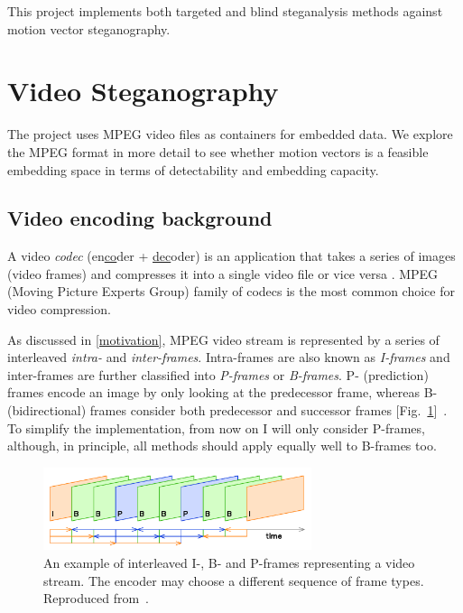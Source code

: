 \documentclass[12pt,british,twoside,notitlepage,usenames,dvipsnames,hypens,final]{report}
\numberwithin{equation}{section}
\numberwithin{figure}{section}
\begin{document}
This project implements both targeted and blind steganalysis methods against motion vector steganography.

\section{Video Steganography}

The project uses MPEG video files as containers for embedded data. We explore the MPEG format in more detail to see whether motion vectors is a feasible embedding space in terms of detectability and embedding capacity.  

\subsection{Video encoding background}

A video \emph{codec} (en\underline{co}der + \underline{dec}oder) is an application that takes a series of images (video frames) and compresses it into a single video file or vice versa \cite[sec.~3.1]{richardson2004h}. MPEG (Moving Picture Experts Group) family of codecs is the most common choice for video compression.

As discussed in \ref{motivation}, MPEG video stream is represented by a series of interleaved \emph{intra-} and \emph{inter-frames}. Intra-frames are also known as \emph{I-frames} and inter-frames are further classified into \emph{P-frames} or \emph{B-frames}. P- (prediction) frames encode an image by only looking at the predecessor frame, whereas B- (bidirectional) frames consider both predecessor and successor frames [Fig.~\ref{fig:ipb-seq}]~\cite{crowcroft1999internetworking}. To simplify the implementation, from now on I will only consider P-frames, although, in principle, all methods should apply equally well to B-frames too.

\begin{figure}[tbh]
\centerline{\includegraphics[width=0.7\textwidth, height=0.7\textheight, keepaspectratio]{img/IPB_images_sequence.png}}
\caption{An example of interleaved I-, B- and P-frames representing a video stream. The encoder may choose a different sequence of frame types. Reproduced from~\cite{interframe-wiki}.}
\label{fig:ipb-seq}
\end{figure}
\end{document}
